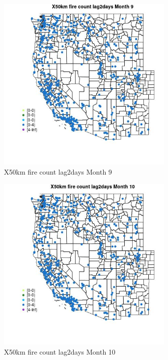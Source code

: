 \begin{figure} 
\centering  
\includegraphics[width=0.77\textwidth]{Code_Outputs/Report_ML_input_PM25_Step4_part_e_de_duplicated_aves_compiled_2019-05-14wNAs_MapObsMo9X50km_fire_count_lag2days.jpg} 
\caption{\label{fig:Report_ML_input_PM25_Step4_part_e_de_duplicated_aves_compiled_2019-05-14wNAsMapObsMo9X50km_fire_count_lag2days}X50km fire count lag2days Month 9} 
\end{figure} 
 

\begin{figure} 
\centering  
\includegraphics[width=0.77\textwidth]{Code_Outputs/Report_ML_input_PM25_Step4_part_e_de_duplicated_aves_compiled_2019-05-14wNAs_MapObsMo10X50km_fire_count_lag2days.jpg} 
\caption{\label{fig:Report_ML_input_PM25_Step4_part_e_de_duplicated_aves_compiled_2019-05-14wNAsMapObsMo10X50km_fire_count_lag2days}X50km fire count lag2days Month 10} 
\end{figure} 
 

